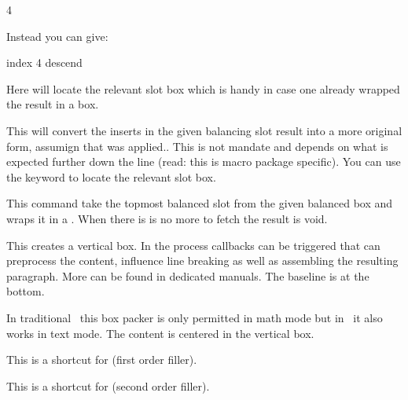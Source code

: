 \starttyping
{}  4
\stoptyping

Instead you can give:

\starttyping
{}  index 4 descend \relax
\stoptyping

Here  will locate the relevant slot box which is handy in case one
already wrapped the result in a box.

\stopnewprimitive

\startnewprimitive[title={\prm {vbalancedreinsert}}]

This will convert the inserts in the given balancing slot result into a more
original form, assumign that  was applied.. This is not
mandate and depends on what is expected further down the line (read: this is
macro package specific). You can use the keyword  to locate the
relevant slot box.

\stopnewprimitive

\startnewprimitive[title={\prm {vbalancedtop}}]

This command take the topmost balanced slot from the given balanced box and wraps
it in a \type {\vbox}. When there is is no more to fetch the result is void.

\stopnewprimitive

\startoldprimitive[title={\prm {vbox}}]

This creates a vertical box. In the process callbacks can be triggered that can
preprocess the content, influence line breaking as well as assembling the
resulting paragraph. More can be found in dedicated manuals. The baseline is
at the bottom.

\stopoldprimitive

\startoldprimitive[title={\prm {vcenter}}]

In traditional \TEX\ this box packer is only permitted in math mode but in
\LUAMETATEX\ it also works in text mode. The content is centered in the vertical
box.

\stopoldprimitive

\startoldprimitive[title={\prm {vfil}}]

This is a shortcut for  (first order filler).

\stopoldprimitive

\startoldprimitive[title={\prm {vfill}}]

This is a shortcut for  (second order filler).

\stopoldprimitive

